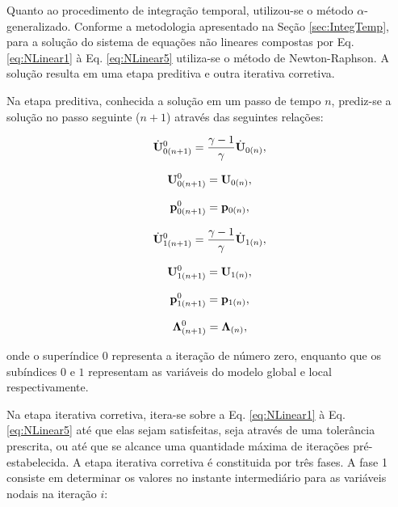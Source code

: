 \documentclass[tese_patricia]{subfiles}
\begin{document}
Quanto ao procedimento de integração temporal, utilizou-se o método $\alpha$-generalizado. Conforme a metodologia apresentado na Seção \ref{sec:IntegTemp}, para a solução do sistema de equações não lineares compostas por Eq. \eqref{eq:NLinear1} à Eq. \eqref{eq:NLinear5} utiliza-se o método de Newton-Raphson. A solução resulta em uma etapa preditiva e outra iterativa corretiva.

Na etapa preditiva, conhecida a solução em um passo de tempo $n$, prediz-se a solução no passo seguinte ($n+1$) através das seguintes relações:

\begin{align}
	\dot{\mathbf{U}}_{0(n+1)}^{0} = \frac{\gamma-1}{\gamma}\dot{\mathbf{U}}_{0(n)} \label{eq:PredArlq1},
\end{align}

\begin{align}
	\mathbf{U}_{0(n+1)}^{0} = \mathbf{U}_{0(n)}, \label{eq:PredArlq2}
\end{align}

\begin{align}
	\mathbf{p}_{0(n+1)}^{0} = \mathbf{p}_{0(n)},\label{eq:PredArlq3}
\end{align}

\begin{align}
	\dot{\mathbf{U}}_{1(n+1)}^{0} = \frac{\gamma-1}{\gamma}\dot{\mathbf{U}}_{1(n)} \label{eq:PredArlq4},
\end{align}

\begin{align}
	\mathbf{U}_{1(n+1)}^{0} = \mathbf{U}_{1(n)}, \label{eq:PredArlq5}
\end{align}

\begin{align}
	\mathbf{p}_{1(n+1)}^{0} = \mathbf{p}_{1(n)},\label{eq:PredArlq6}
\end{align}

\begin{align}
	\boldsymbol{\Lambda}_{(n+1)}^{0} = \boldsymbol{\Lambda}_{(n)},\label{eq:PredArlq7}
\end{align}

\noindent onde o superíndice $0$ representa a iteração de número zero, enquanto que os subíndices $0$ e $1$ representam as variáveis do modelo global e local respectivamente.

Na etapa iterativa corretiva, itera-se sobre a Eq. \eqref{eq:NLinear1} à Eq. \eqref{eq:NLinear5} até que elas sejam satisfeitas, seja através de uma tolerância prescrita, ou até que se alcance uma quantidade máxima de iterações pré-estabelecida. A etapa iterativa corretiva é constituida por três fases. A fase 1 consiste em determinar os valores no instante intermediário para as variáveis nodais na iteração $i$:
\end{document}
